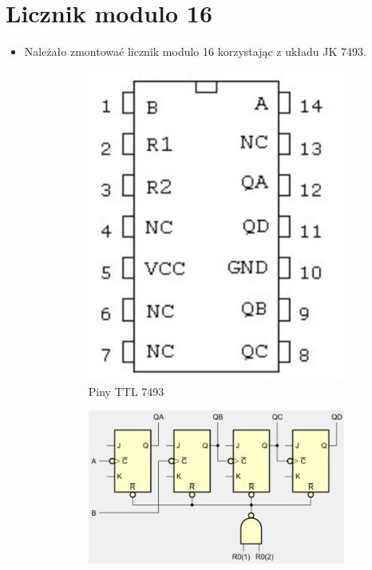 \chapter{Licznik modulo 16}
\label{chapter:mod16}

\begin{itemize}
    \item Należało zmontować licznik modulo 16 korzystając z układu JK 7493.
        \begin{figure}[H]
            \centering
            \begin{subfigure}[H]{0.35\textwidth}
                \includegraphics[width=\textwidth]{img/schemes/7493_pins.png}
                \caption{Piny TTL 7493}
            \end{subfigure}
            \begin{subfigure}[H]{0.6\textwidth}
                \includegraphics[width=\textwidth]{img/schemes/logic_scheme_7943.png}

\end{subfigure}
\end{figure}
\end{itemize}
